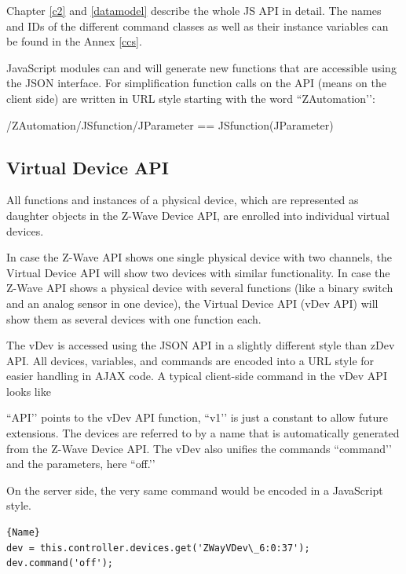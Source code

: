Chapter \ref{c2} and \ref{datamodel} describe the whole JS API in detail. The 
names and IDs of the different command classes as well as their instance variables 
can be found in the Annex \ref{ccs}.

JavaScript modules can and will generate new functions that are accessible using the 
JSON interface. For simplification function calls on the API (means on the client side) 
are written in URL style starting with the word ``ZAutomation’’:


\begin{center}
/ZAutomation/JSfunction/JParameter
== JSfunction(JParameter)
\end{center}

\subsection{Virtual Device API}

All functions and instances of a physical device, which are represented as daughter objects
in the Z-Wave Device API, are enrolled into individual virtual devices.

In case the Z-Wave API shows one single physical device with two channels, the Virtual 
Device API will show two devices with similar functionality. In case the Z-Wave API shows 
a physical device with several functions (like a binary switch and an analog sensor in 
one device), the Virtual Device API (vDev API) will show them as several devices with 
one function each.

The vDev is accessed using the JSON API in a slightly different style than zDev API. 
All devices, variables, and commands are encoded into a URL style for easier handling 
in AJAX code. A typical client-side command in the vDev API looks like




``API’’ points to the vDev API function, ``v1’’ is just a constant to allow future extensions. 
The devices are referred to by a name that is automatically generated from the Z-Wave Device 
API. The vDev also unifies the commands ``command’’ and the parameters, here ``off.’’

On the server side, the very same command would be encoded in a JavaScript style.

\begin{lstlisting}[caption=Bind a function, basicstyle=\small]{Name}
dev = this.controller.devices.get('ZWayVDev\_6:0:37');
dev.command('off');
\end{lstlisting}

